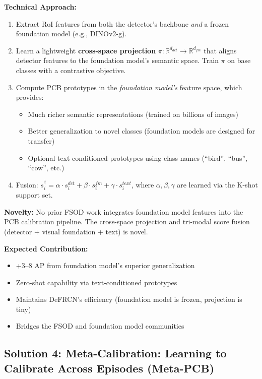 \documentclass[11pt,a4paper]{article}
\begin{document}
\textbf{Technical Approach:}
\begin{enumerate}[nosep]
    \item Extract RoI features from both the detector's backbone \textit{and} a frozen foundation model (e.g., DINOv2-g).
    \item Learn a lightweight \textbf{cross-space projection} $\pi: \mathbb{R}^{d_{det}} \rightarrow \mathbb{R}^{d_{fm}}$ that aligns detector features to the foundation model's semantic space. Train $\pi$ on base classes with a contrastive objective.
    \item Compute PCB prototypes in the \textit{foundation model's} feature space, which provides:
    \begin{itemize}[nosep]
        \item Much richer semantic representations (trained on billions of images)
        \item Better generalization to novel classes (foundation models are designed for transfer)
        \item Optional text-conditioned prototypes using class names (``bird'', ``bus'', ``cow'', etc.)
    \end{itemize}
    \item Fusion: $s_i^\dagger = \alpha \cdot s_i^{det} + \beta \cdot s_i^{fm} + \gamma \cdot s_i^{text}$, where $\alpha, \beta, \gamma$ are learned via the K-shot support set.
\end{enumerate}

\textbf{Novelty:} No prior FSOD work integrates foundation model features into the PCB calibration pipeline. The cross-space projection and tri-modal score fusion (detector + visual foundation + text) is novel.

\textbf{Expected Contribution:}
\begin{itemize}[nosep]
    \item +3--8 AP from foundation model's superior generalization
    \item Zero-shot capability via text-conditioned prototypes
    \item Maintains DeFRCN's efficiency (foundation model is frozen, projection is tiny)
    \item Bridges the FSOD and foundation model communities
\end{itemize}

\subsection{Solution 4: Meta-Calibration: Learning to Calibrate Across Episodes (Meta-PCB)}
\end{document}
